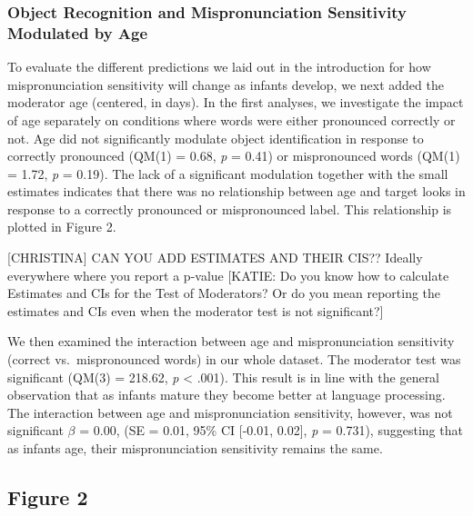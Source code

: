 \documentclass[man]{apa6}
\theoremstyle{definition}
\theoremstyle{definition}
\theoremstyle{definition}
\theoremstyle{remark}
\begin{document}
\subsubsection{Object Recognition and Mispronunciation Sensitivity
Modulated by
Age}\label{object-recognition-and-mispronunciation-sensitivity-modulated-by-age}

To evaluate the different predictions we laid out in the introduction
for how mispronunciation sensitivity will change as infants develop, we
next added the moderator age (centered, in days). In the first analyses,
we investigate the impact of age separately on conditions where words
were either pronounced correctly or not. Age did not significantly
modulate object identification in response to correctly pronounced
(QM(1) = 0.68, \emph{p} = 0.41) or mispronounced words (QM(1) = 1.72,
\emph{p} = 0.19). The lack of a significant modulation together with the
small estimates indicates that there was no relationship between age and
target looks in response to a correctly pronounced or mispronounced
label. This relationship is plotted in Figure 2.

{[}CHRISTINA{]} CAN YOU ADD ESTIMATES AND THEIR CIS?? Ideally everywhere
where you report a p-value {[}KATIE: Do you know how to calculate
Estimates and CIs for the Test of Moderators? Or do you mean reporting
the estimates and CIs even when the moderator test is not
significant?{]}

We then examined the interaction between age and mispronunciation
sensitivity (correct vs.~mispronounced words) in our whole dataset. The
moderator test was significant (QM(3) = 218.62, \emph{p} \textless{}
.001). This result is in line with the general observation that as
infants mature they become better at language processing. The
interaction between age and mispronunciation sensitivity, however, was
not significant \(\beta\) = 0.00, (SE = 0.01, 95\% CI {[}-0.01, 0.02{]},
\emph{p} = 0.731), suggesting that as infants age, their
mispronunciation sensitivity remains the same.

\subsection{Figure 2}\label{figure-2}
\end{document}
